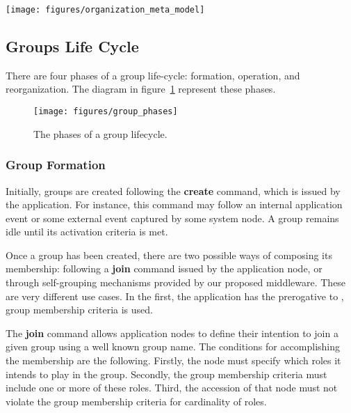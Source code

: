 \begin{figure*}[t!]
	\centering
	\texttt{[image: figures/organization\_meta\_model]}
	\caption{The GRD organization meta-model. Each device in the organization may play different roles in different groups (active roles). Also, roles are specialized into application and adaptation roles.}
	\label{fig:organization_meta_model}
\end{figure*}

\subsection{Groups Life Cycle}

There are four phases of a group life-cycle: formation, operation, and reorganization. The diagram in figure~\ref{fig:group_phases} represent these phases.

\begin{figure}[t!]
\centering
\texttt{[image: figures/group\_phases]}
\caption{The phases of a group lifecycle.}
\label{fig:group_phases}
\end{figure}

\subsubsection{Group Formation}

Initially, groups are created following the \textbf{create} command, which is issued by the application. For instance, this command may follow an internal application event or some external event captured by some system node. A group remains idle until its activation criteria is met. 

Once a group has been created, there are two possible ways of composing its membership: following a \textbf{join} command issued by the application node, or through self-grouping mechanisms provided by our proposed middleware. These are very different use cases. In the first, the application has the prerogative to , group membership criteria is used.

The \textbf{join} command allows application nodes to define their intention to join a given group using a well known group name. The conditions for accomplishing the membership are the following. Firstly, the node must specify which roles it intends to play in the group. Secondly, the group membership criteria must include one or more of these roles. Third, the accession of that node must not violate the group membership criteria for cardinality of roles. 

